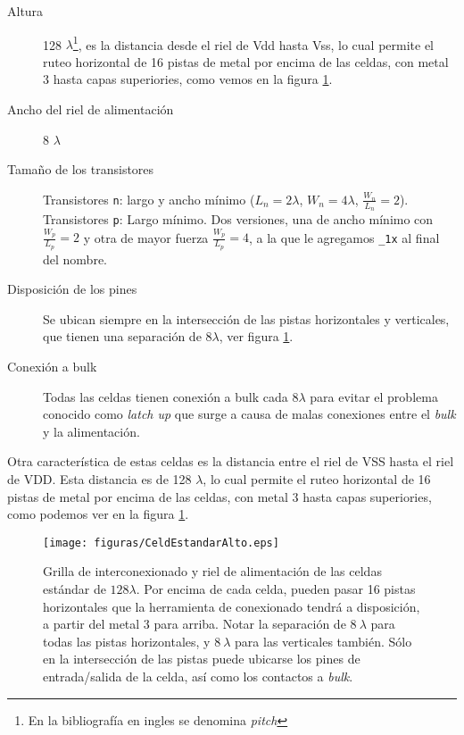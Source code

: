 \begin{description}
\item[Altura] 128 $\lambda$\footnote{En la bibliografía en ingles se denomina \emph{pitch}}, es la distancia desde el riel de Vdd hasta Vss, lo cual permite el ruteo horizontal de 16 pistas de metal por encima de las celdas, con metal 3 hasta capas superiories, como vemos en la figura \ref{fig:pitchCeldaEstandar}.  
\item[Ancho del riel de alimentación] 8 $\lambda$
\item[Tamaño de los transistores] Transistores \verb.n.: largo y ancho mínimo ($L_n = 2 \lambda$, $W_n =4 \lambda$, $\frac{W_n}{L_n}=2$). Transistores \verb.p.: Largo mínimo. Dos versiones, una de ancho mínimo con $\frac{W_p}{L_p}=2$ y otra de mayor fuerza $\frac{W_p}{L_p}=4$, a la que le agregamos \verb._1x. al final del nombre. 
\item[Disposición de los pines] Se ubican siempre en la intersección de las pistas horizontales y verticales, que tienen una separación de $8 \lambda$, ver figura \ref{fig:pitchCeldaEstandar}.
\item[Conexión a bulk] Todas las celdas tienen conexión a bulk cada $8\lambda$ para evitar el problema conocido como \emph{latch up} que surge a causa de malas conexiones entre el \emph{bulk} y la alimentación.
\end{description}


Otra característica de estas celdas es la distancia entre el riel de VSS hasta el riel de VDD. Esta distancia es de 128 $\lambda$, lo cual permite el ruteo horizontal de 16 pistas de metal por encima de las celdas, con metal 3 hasta capas superiories, como podemos ver en la figura \ref{fig:pitchCeldaEstandar}.  

 \begin{figure}[h]
\centering
\texttt{[image: figuras/CeldEstandarAlto.eps]}
  \caption{Grilla de interconexionado y riel de alimentación de las celdas estándar de $128 \lambda$. Por encima de cada celda, pueden pasar 16 pistas horizontales que la herramienta de conexionado tendrá a disposición, a partir del metal 3 para arriba. Notar la separación de $8~ \lambda$ para todas las pistas horizontales, y $8~\lambda$ para las verticales también. Sólo en la intersección de las pistas puede ubicarse los pines de entrada/salida de la celda, así como los contactos a \emph{bulk}.}
  \label{fig:pitchCeldaEstandar}
\end{figure}


